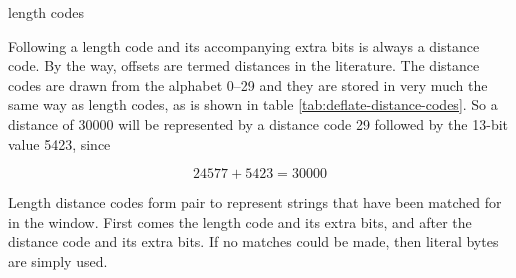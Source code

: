 \begin{table}
  \caption{ length codes}
  \label{tab:deflate-length-codes}
\end{table}

Following a length code and its accompanying extra bits is always a
distance code. By the way, offsets are termed distances in the 
literature. The distance codes are drawn from the alphabet 0--29 and
they are stored in very much the same way as length codes, as is shown
in table \ref{tab:deflate-distance-codes}. So a distance of $30000$
will be represented by a distance code 29 followed by the 13-bit value
5423, since

\begin{equation*}
  24577 + 5423 = 30000
\end{equation*}

Length distance codes form pair to represent strings that have been
matched for in the window. First comes the length code and its extra
bits, and after the distance code and its extra bits. If no matches
could be made, then literal bytes are simply used.

